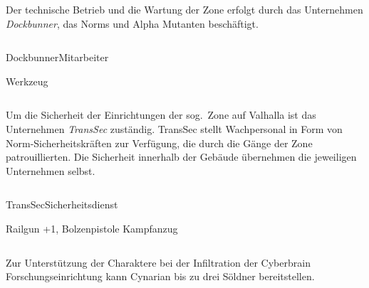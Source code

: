 
\begin{column}[l]{0.45}
    Der technische Betrieb und die Wartung der Zone erfolgt durch das Unternehmen \emph{Dockbunner}, das Norms und Alpha Mutanten 
    beschäftigt.
\end{column}
\begin{column}[r]{0.45}
    \begin{nscsheet}[h]{Dockbunner\newline{}Mitarbeiter}
        \nscstats[]
        \nscruler
        \begin{nscinventory}
            \nscitem[Waffen] Werkzeug
        \end{nscinventory}
    \end{nscsheet}
\end{column}    


\begin{column}[l]{0.45}
    Um die Sicherheit der Einrichtungen der sog.~Zone auf Valhalla ist das Unternehmen \emph{TransSec} zuständig. TransSec stellt
    Wachpersonal in Form von Norm-Sicherheitskräften zur Verfügung, die durch die Gänge der Zone patrouillierten. Die Sicherheit
    innerhalb der Gebäude übernehmen die jeweiligen Unternehmen selbst.
\end{column}
\begin{column}[r]{0.45}
    \begin{nscsheet}[h]{TransSec\newline{}Sicherheitsdienst}
        \nscstats[ATT=2,AGG=2]
        \nscruler
        \begin{nscinventory}
            \nscitem[Waffen] Railgun +1, Bolzenpistole
            \nscitem[Rüstung] Kampfanzug
        \end{nscinventory}
    \end{nscsheet}
\end{column}
\vfill

\pagebreak
{}

Zur Unterstützung der Charaktere bei der Infiltration der Cyberbrain Forschungseinrichtung kann Cynarian bis zu 
drei Söldner bereitstellen.

